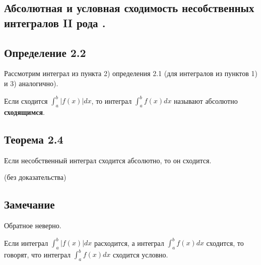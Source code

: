 {
\subsection{Абсолютная и условная сходимость несобственных интегралов II рода .}
\subsection*{Определение 2.2}

Рассмотрим интеграл из пункта 2) определения 2.1 (для интегралов из пунктов 1) и 3) аналогично).




Если сходится \( \int_{a}^{b} |f(x)| dx \), то интеграл \( \int_{a}^{b} f(x) dx\) называют абсолютно \textbf{сходящимся}.

\subsection*{Теорема 2.4}

Если несобственный интеграл сходится абсолютно, то он сходится.

(без доказательства)

\subsection*{Замечание}

Обратное неверно.

Если интеграл \( \int_{a}^{b} |f(x)| dx \) расходится, а интеграл \( \int_{a}^{b} f(x) dx \) сходится, то говорят, что интеграл \( \int_{a}^{b} f(x) dx \) сходится условно.

}